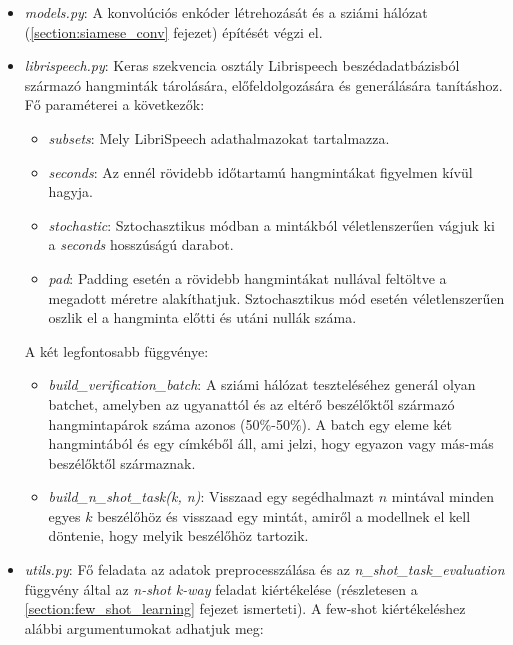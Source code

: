\begin{itemize}
	\item \emph{models.py}: A konvolúciós enkóder létrehozását és a sziámi hálózat (\ref{section:siamese_conv} fejezet) építését végzi el.
	\item \emph{librispeech.py}: Keras szekvencia osztály Librispeech beszédadatbázisból származó hangminták tárolására, előfeldolgozására és generálására tanításhoz. Fő paraméterei a következők:
	\begin{itemize}
		\item \emph{subsets}: Mely LibriSpeech adathalmazokat tartalmazza.
		\item \emph{seconds}: Az ennél rövidebb időtartamú hangmintákat figyelmen kívül hagyja.
		\item \emph{stochastic}: Sztochasztikus módban a mintákból véletlenszerűen vágjuk ki a \emph{seconds} hosszúságú darabot.
		\item \emph{pad}: Padding esetén a rövidebb hangmintákat nullával feltöltve a megadott méretre alakíthatjuk. Sztochasztikus mód esetén véletlenszerűen oszlik el a hangminta előtti és utáni nullák száma.
	\end{itemize}
	
	A két legfontosabb függvénye:
	
	\begin{itemize}
		\item \emph{build\_verification\_batch}: A sziámi hálózat teszteléséhez generál olyan batchet, amelyben az ugyanattól és az eltérő beszélőktől származó hangmintapárok száma azonos (50\%-50\%). A batch egy eleme két hangmintából és egy címkéből áll, ami jelzi, hogy egyazon vagy más-más beszélőktől származnak.
		\item \emph{build\_n\_shot\_task(k, n)}: Visszaad egy segédhalmazt $n$ mintával minden egyes $k$ beszélőhöz és visszaad egy mintát, amiről a modellnek el kell döntenie, hogy melyik beszélőhöz tartozik.
	\end{itemize}
	\item \emph{utils.py}: Fő feladata az adatok preprocesszálása és az \emph{n\_shot\_task\_evaluation} függvény által az \emph{n-shot k-way} feladat kiértékelése (részletesen a \ref{section:few_shot_learning} fejezet ismerteti). A few-shot kiértékeléshez alábbi argumentumokat adhatjuk meg:
	

\end{itemize}
